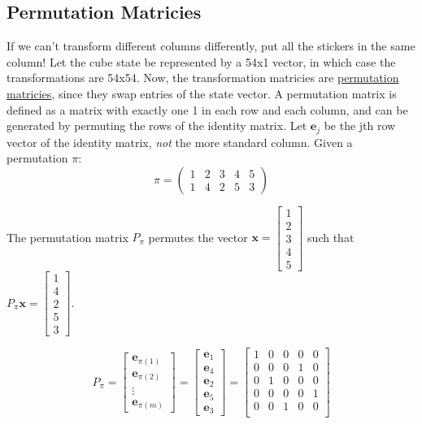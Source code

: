\documentclass[11pt, oneside]{article}
\newcommand{\ve}[1]{\mathbf{#1}}
\theoremstyle{plain}
\begin{document}
\subsection{Permutation Matricies}
If we can't transform different columns differently, put all the stickers in the same column!
Let the cube state be represented by a 54x1 vector, in which case the transformations are 54x54.
Now, the transformation matricies are \href{https://en.wikipedia.org/wiki/Permutation_matrix}{permutation matricies},
since they swap entries of the state vector. A permutation matrix is defined as a matrix with exactly one 1 in each row and each column, and can be generated
by permuting the rows of the identity matrix. Let \( \ve{e}_j \) be the jth
row vector of the identity matrix, \textit{not} the more standard column.
Given a permutation \( \pi \):
\[ \pi = \begin{pmatrix}
         1 & 2 & 3 & 4 & 5 \\
         1 & 4 & 2 & 5 & 3
        \end{pmatrix}
\]

The permutation matrix \( P_{\pi} \) permutes the vector \( \ve{x} = \begin{bmatrix} 1 \\ 2 \\ 3 \\ 4 \\ 5 \end{bmatrix} \) such that \( P_{\pi}\ve{x} =
\begin{bmatrix} 1 \\ 4 \\ 2 \\ 5 \\ 3 \end{bmatrix} \).

\[ P_{\pi} = \begin{bmatrix} \ve{e}_{\pi(1)} \\ \ve{e}_{\pi(2)} \\ \vdots \\ \ve{e}_{\pi(m)} \end{bmatrix} =
\begin{bmatrix} \ve{e}_{1} \\ \ve{e}_{4} \\ \ve{e}_{2} \\ \ve{e}_{5}  \\ \ve{e}_{3} \end{bmatrix} =
\begin{bmatrix}
1 & 0 & 0 & 0 & 0 \\
0 & 0 & 0 & 1 & 0 \\
0 & 1 & 0 & 0 & 0 \\
0 & 0 & 0 & 0 & 1 \\
0 & 0 & 1 & 0 & 0 \\
\end{bmatrix} \]
\end{document}
